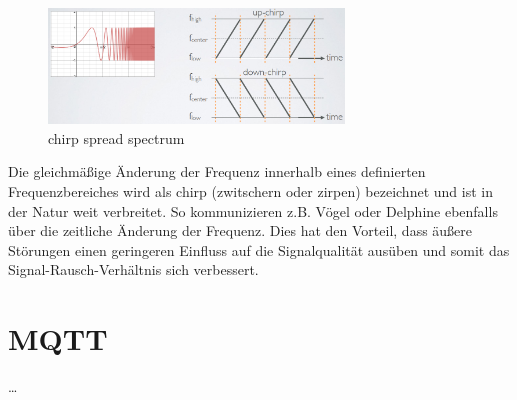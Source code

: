 \begin{figure}[h]
 \centering
 \includegraphics[width=0.7\textwidth]{pictures/chirp-sf}
 \caption[chirp spread spectrum]{chirp spread spectrum \cite{lora2020}}
 \label{fig:css}
\end{figure}

Die gleichmäßige Änderung der Frequenz innerhalb eines definierten Frequenzbereiches wird als chirp (zwitschern oder zirpen) bezeichnet und ist in der Natur weit verbreitet. So kommunizieren z.B. Vögel oder Delphine ebenfalls über die zeitliche Änderung der Frequenz. Dies hat den Vorteil, dass äußere Störungen einen geringeren Einfluss auf die Signalqualität ausüben und somit das Signal-Rausch-Verhältnis sich verbessert.    


 


\section{MQTT} \label{MQTT}

\ldots


